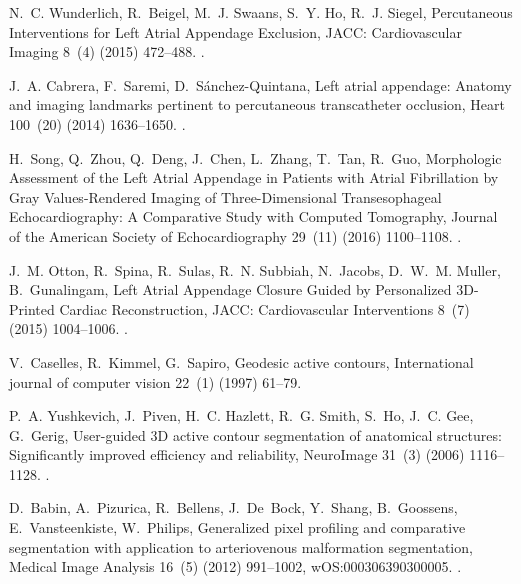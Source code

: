 \documentclass[review]{elsarticle}
\begin{document}
\begin{thebibliography}{10}
N.~C. Wunderlich, R.~Beigel, M.~J. Swaans, S.~Y. Ho, R.~J. Siegel, Percutaneous
  {{Interventions}} for {{Left Atrial Appendage Exclusion}}, JACC:
  Cardiovascular Imaging 8~(4) (2015) 472--488.
\newblock \href {http://dx.doi.org/10.1016/j.jcmg.2015.02.002}
  {}.

J.~A. Cabrera, F.~Saremi, D.~{S\'anchez-Quintana}, Left atrial appendage:
  Anatomy and imaging landmarks pertinent to percutaneous transcatheter
  occlusion, Heart 100~(20) (2014) 1636--1650.
\newblock \href {http://dx.doi.org/10.1136/heartjnl-2013-304464}
  {}.

H.~Song, Q.~Zhou, Q.~Deng, J.~Chen, L.~Zhang, T.~Tan, R.~Guo, Morphologic
  {{Assessment}} of the {{Left Atrial Appendage}} in {{Patients}} with {{Atrial
  Fibrillation}} by {{Gray Values}}-{{Rendered
  Imaging}} of {{Three}}-{{Dimensional Transesophageal Echocardiography}}: {{A
  Comparative Study}} with {{Computed Tomography}}, Journal of the American
  Society of Echocardiography 29~(11) (2016) 1100--1108.
\newblock \href {http://dx.doi.org/10.1016/j.echo.2016.08.003}
  {}.

J.~M. Otton, R.~Spina, R.~Sulas, R.~N. Subbiah, N.~Jacobs, D.~W.~M. Muller,
  B.~Gunalingam, Left {{Atrial Appendage Closure Guided}} by {{Personalized
  3D}}-{{Printed Cardiac Reconstruction}}, JACC: Cardiovascular Interventions
  8~(7) (2015) 1004--1006.
\newblock \href {http://dx.doi.org/10.1016/j.jcin.2015.03.015}
  {}.

V.~Caselles, R.~Kimmel, G.~Sapiro, Geodesic active contours, International
  journal of computer vision 22~(1) (1997) 61--79.

P.~A. Yushkevich, J.~Piven, H.~C. Hazlett, R.~G. Smith, S.~Ho, J.~C. Gee,
  G.~Gerig, User-guided {{3D}} active contour segmentation of anatomical
  structures: {{Significantly}} improved efficiency and reliability, NeuroImage
  31~(3) (2006) 1116--1128.
\newblock \href {http://dx.doi.org/10.1016/j.neuroimage.2006.01.015}
  {}.

D.~Babin, A.~Pizurica, R.~Bellens, J.~De~Bock, Y.~Shang, B.~Goossens,
  E.~Vansteenkiste, W.~Philips, Generalized pixel profiling and comparative
  segmentation with application to arteriovenous malformation segmentation,
  Medical Image Analysis 16~(5) (2012) 991--1002, wOS:000306390300005.
\newblock \href {http://dx.doi.org/10.1016/j.media.2012.02.006}
  {}.


\end{thebibliography}
\end{document}
